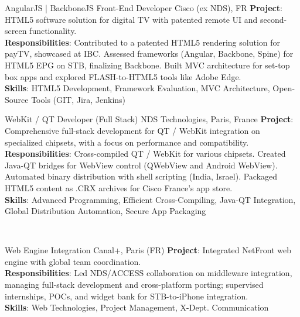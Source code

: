 \documentclass[
  a4paper,
   maincolor=cvblue,
   sectioncolor=cvblue,
]{fortysecondscv}
\begin{document}
\begin{cvtable}
    {AngularJS | BackboneJS Front-End Developer}
    {Cisco (ex NDS), FR}
    {
      \textbf{Project}: HTML5 software solution for digital TV with patented remote UI and second-screen functionality.\\
      \textbf{Responsibilities}:
          Contributed to a patented HTML5 rendering solution for payTV, showcased at IBC. Assessed frameworks (Angular, Backbone, Spine) for HTML5 EPG on STB, finalizing Backbone. Built MVC architecture for set-top box apps and explored FLASH-to-HTML5 tools like Adobe Edge.\\
      \textbf{Skills}: HTML5 Development, Framework Evaluation, MVC Architecture, Open-Source Tools (GIT, Jira, Jenkins)\\
    }
\end{cvtable}


\begin{cvtable}
    {WebKit / QT Developer (Full Stack)}
    {NDS Technologies, Paris, France}
    {
      \textbf{Project}: Comprehensive full-stack development for QT / WebKit integration on specialized chipsets, with a focus on performance and compatibility.\\
      \textbf{Responsibilities}:
          Cross-compiled QT / WebKit for various chipsets. Created Java-QT bridges for WebView control (QWebView and Android WebView). Automated binary distribution with shell scripting (India, Israel). Packaged HTML5 content as .CRX archives for Cisco France’s app store.\\
      \textbf{Skills}: Advanced Programming, Efficient Cross-Compiling, Java-QT Integration, Global Distribution Automation, Secure App Packaging\\
    }
\end{cvtable}
\\
\begin{cvtable}
    {Web Engine Integration}
    {Canal+, Paris (FR)}
    {
      \textbf{Project}: Integrated NetFront web engine with global team coordination.\\
      \textbf{Responsibilities}:
          Led NDS/ACCESS collaboration on middleware integration, managing full-stack development and cross-platform porting; supervised internships, POCs, and widget bank for STB-to-iPhone integration.\\
      \textbf{Skills}: Web Technologies, Project Management, X-Dept. Communication\\
    }
\end{cvtable}
\end{document}
